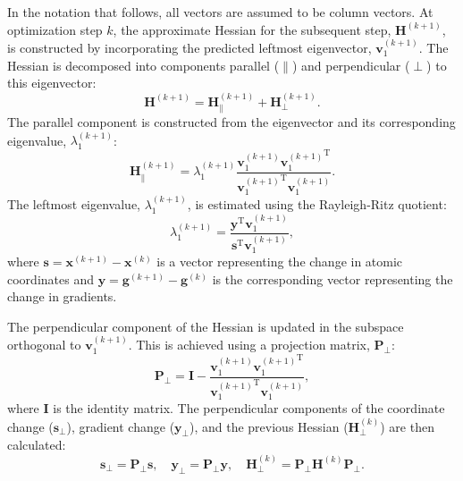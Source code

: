 \documentclass[12pt]{article}
\begin{document}
In the notation that follows, all vectors are assumed to be column vectors. At optimization step $k$, the approximate Hessian for the subsequent step, $\mathbf{H}^{(k+1)}$, is constructed by incorporating the predicted leftmost eigenvector, $\mathbf{v}_1^{(k+1)}$. The Hessian is decomposed into components parallel ($\parallel$) and perpendicular ($\perp$) to this eigenvector:
\begin{equation}
    \mathbf{H}^{(k+1)}=\mathbf{H}_{\parallel}^{(k+1)}+\mathbf{H}_{\perp}^{(k+1)}.
\end{equation}
The parallel component is constructed from the eigenvector and its corresponding eigenvalue, $\lambda_1^{(k+1)}$:
\begin{equation}
    \mathbf{H}_{\parallel}^{(k+1)}=\lambda_1^{(k+1)}\frac{\mathbf{v}_1^{(k+1)} {\mathbf{v}_1^{(k+1)}}^{\mathrm{T}} }{{\mathbf{v}_1^{(k+1)}}^{\mathrm{T}} {\mathbf{v}_1^{(k+1)}}}.
\end{equation}
The leftmost eigenvalue, $\lambda_1^{(k+1)}$, is estimated using the Rayleigh-Ritz quotient:
\begin{equation}
    \lambda_1^{(k+1)}=\frac{\mathbf{y}^\mathrm{T}{\mathbf{v}_1^{(k+1)}}}{\mathbf{s}^\mathrm{T}{\mathbf{v}_1^{(k+1)}}},
\end{equation}
where $\mathbf{s}=\mathbf{x}^{(k+1)}-\mathbf{x}^{(k)}$ is a vector representing the change in atomic coordinates and $\mathbf{y}=\mathbf{g}^{(k+1)}-\mathbf{g}^{(k)}$ is the corresponding vector representing the change in gradients. \par

The perpendicular component of the Hessian is updated in the subspace orthogonal to $\mathbf{v}^{(k+1)}_{1}$. This is achieved using a projection matrix, $\mathbf{P}_{\perp}$:
\begin{equation}
    \mathbf{P}_{\perp}=\mathbf{I}-\frac{{\mathbf{v}_1^{(k+1)}} {\mathbf{v}_1^{(k+1)}}^\mathrm{T}}{{\mathbf{v}_1^{(k+1)}}^\mathrm{T} {\mathbf{v}_1^{(k+1)}}},
\end{equation}
where $\mathbf{I}$ is the identity matrix. The perpendicular components of the coordinate change ($\mathbf{s}_{\perp}$), gradient change ($\mathbf{y}_{\perp}$), and the previous Hessian ($\mathbf{H}_{\perp}^{(k)}$) are then calculated:
\begin{equation}
    \mathbf{s}_{\perp}=\mathbf{P}_{\perp}\mathbf{s},\quad
    \mathbf{y}_{\perp}=\mathbf{P}_{\perp}\mathbf{y},\quad
    \mathbf{H}^{(k)}_{\perp}=\mathbf{P}_{\perp}\mathbf{H}^{(k)}\mathbf{P}_{\perp}.
\end{equation}\par
\end{document}
